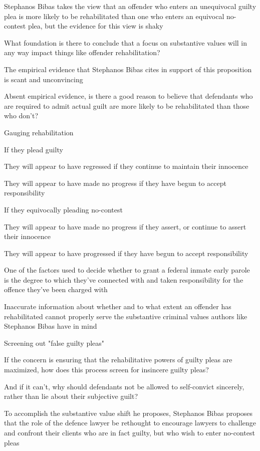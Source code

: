 Stephanos Bibas takes the view that an offender who enters an unequivocal guilty plea is more likely to be rehabilitated than one who enters an equivocal no-contest plea, but the evidence for this view is shaky

What foundation is there to conclude that a focus on substantive values will in any way impact things like offender rehabilitation?

The empirical evidence that Stephanos Bibas cites in support of this proposition is scant and unconvincing

Absent empirical evidence, is there a good reason to believe that defendants who are required to admit actual guilt are more likely to be rehabilitated than those who don't?

Gauging rehabilitation

If they plead guilty

They will appear to have regressed if they continue to maintain their innocence

They will appear to have made no progress if they have begun to accept responsibility

If they equivocally pleading no-contest

They will appear to have made no progress if they assert, or continue to assert their innocence

They will appear to have progressed if they have begun to accept responsibility

One of the factors used to decide whether to grant a federal inmate early parole is the degree to which they've connected with and taken responsibility for the offence they've been charged with

Inaccurate information about whether and to what extent an offender has rehabilitated cannot properly serve the substantive criminal values authors like Stephanos Bibas have in mind

Screening out "false guilty pleas"

If the concern is ensuring that the rehabilitative powers of guilty pleas are maximized, how does this process screen for insincere guilty pleas?

And if it can't, why should defendants not be allowed to self-convict sincerely, rather than lie about their subjective guilt?

To accomplish the substantive value shift he proposes, Stephanos Bibas proposes that the role of the defence lawyer be rethought to encourage lawyers to challenge and confront their clients who are in fact guilty, but who wish to enter no-contest pleas


